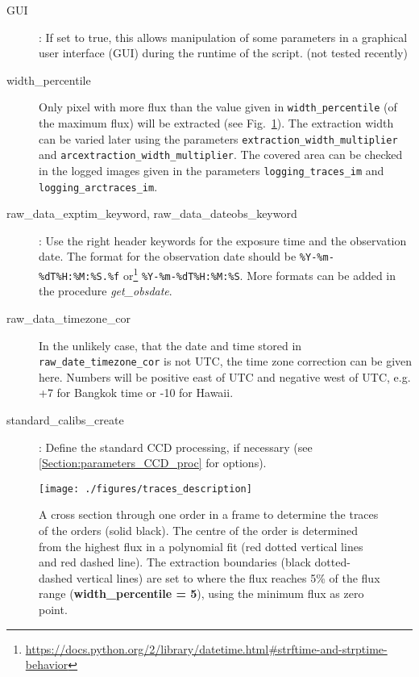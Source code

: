 \documentclass[10pt,a4paper]{article}
\begin{document}
\begin{description}
  \item[GUI] : If set to true, this allows manipulation of some parameters in a graphical user interface (GUI) during the runtime of the script. (not tested recently)
  \item[width\_percentile] Only pixel with more flux than the value given in \verb|width_percentile| (of the maximum flux) will be extracted (see Fig.~\ref{Fig:traces_description}). The extraction width can be varied later using the parameters \verb|extraction_width_multiplier| and \verb|arcextraction_width_multiplier|. The covered area can be checked in the logged images given in the parameters \verb|logging_traces_im| and \verb|logging_arctraces_im|. %
  \item[raw\_data\_exptim\_keyword, raw\_data\_dateobs\_keyword] : Use the right header keywords for the exposure time and the observation date. The format for the observation date should be \verb|%Y-%m-%dT%H:%M:%S.%f| or\footnote{\url{https://docs.python.org/2/library/datetime.html\#strftime-and-strptime-behavior}} \verb|%Y-%m-%dT%H:%M:%S|. More formats can be added in the procedure \textit{get\_obsdate}.
  \item[raw\_data\_timezone\_cor] In the unlikely case, that the date and time stored in \verb|raw_date_timezone_cor| is not UTC, the time zone correction can be given here. Numbers will be positive east of UTC and negative west of UTC, e.g. +7 for Bangkok time or -10 for Hawaii.
  \item[standard\_calibs\_create] : Define the standard CCD processing, if necessary (see \ref{Section:parameters_CCD_proc} for options).
\end{description}

\begin{figure} 
  \begin{center}
    \texttt{[image: ./figures/traces\_description]}
  \end{center} 
  \caption{A cross section through one order in a frame to determine the traces of the orders (solid black). The centre of the order is determined from the highest flux in a polynomial fit (red dotted vertical lines and red dashed line). The extraction boundaries (black dotted-dashed vertical lines) are set to where the flux reaches 5\% of the flux range (\textbf{width\_percentile = 5}), using the minimum flux as zero point.
    \label{Fig:traces_description}}
\end{figure}
\end{document}
